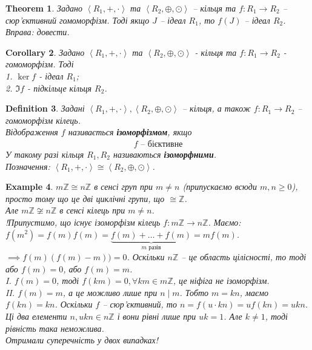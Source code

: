 \documentclass[a4paper, 10pt]{article}
\theoremstyle{theoremdd}
\newtheorem{theorem}{Theorem}[subsection]
\theoremstyle{theoremdd}
\newtheorem{definition}[theorem]{Definition}
\theoremstyle{theoremdd}
\theoremstyle{theoremdd}
\theoremstyle{theoremdd}
\newtheorem{example}[theorem]{Example}
\theoremstyle{theoremdd}
\theoremstyle{theoremdd}
\theoremstyle{theoremdd}
\theoremstyle{theoremdd}
\theoremstyle{theoremdd}
\theoremstyle{theoremdd}
\theoremstyle{theoremdd}
\theoremstyle{theoremdd}
\theoremstyle{theoremdd}
\newtheorem{corollary}[theorem]{Corollary}
\theoremstyle{theoremdd}
\begin{document}
\begin{theorem}
Задано $\left<R_1, +, \cdot \right>$ та $\left<R_2, \oplus, \odot \right>$ -- кільця та $f \colon R_1 \to R_2$ -- сюр'єктивний гомоморфізм. Тоді якщо $J$ -- ідеал $R_1$, то $f(J)$ -- ідеал $R_2$.\\
\textit{Вправа: довести.}
\end{theorem}

\begin{corollary}
Задано $\left<R_1, +, \cdot \right>$ та $\left<R_2, \oplus, \odot \right>$ - кільця та $f: R_1 \to R_2$ - гомоморфізм. Тоді\\
1. $\ker f$ - ідеал $R_1$;\\
2. $\Im f$ - підкільце кільця $R_2$.
\end{corollary}

\begin{definition}
Задані $\left<R_1, +, \cdot \right>, \left<R_2, \oplus, \odot \right>$ -- кільця, а також $f \colon R_1 \to R_2$ -- гомоморфізм кілець.\\
Відображення $f$ називається \textbf{ізоморфізмом}, якщо
\begin{align*}
f \text{ -- бієктивне}
\end{align*}
У такому разі кільця $R_1,R_2$ називаються \textbf{ізоморфними}.\\
Позначення: $\left<R_1,+,\cdot \right> \cong \left<R_2, \oplus, \odot \right>$.
\end{definition}

\begin{example}
$m\mathbb{Z} \cong n \mathbb{Z}$ в сенсі груп при $m \neq n$ (припускаємо всюди $m,n \geq 0$), просто тому що це дві циклічні групи, що $\cong \mathbb{Z}$.\\
Але $m\mathbb{Z} \not\cong n \mathbb{Z}$ в сенсі кілець при $m \neq n$.\\
!Припустимо, що існує ізоморфізм кілець $f \colon m \mathbb{Z} \to n \mathbb{Z}$. Маємо:\\
$f(m^2) = f(m)f(m) = \underbrace{f(m) + \dots + f(m)}_{m \text{ разів}} = m f(m)$.\\
$\implies f(m)(f(m)-m)) = 0$. Оскільки $n \mathbb{Z}$ -- це область цілісності, то тоді або $f(m) = 0$, або $f(m) = m$.\\
I. $f(m) = 0$, тоді $f(km) = 0, \forall km \in m\mathbb{Z}$, це ніфіга не ізоморфізм.\\
II. $f(m) = m$, а це можливо лише при $n \mid m$. Тобто $m = kn$, маємо $f(kn) = kn$. Оскільки $f$ -- сюр'єктивний, то $n = f(u \cdot kn) = u f(kn) = ukn$. Ці два елементи $n, ukn \in n \mathbb{Z}$ і вони рівні лише при $uk = 1$. Але $k \neq 1$, тоді рівність така неможлива.\\
Отримали суперечність у двох випадках!
\end{example}
\end{document}
